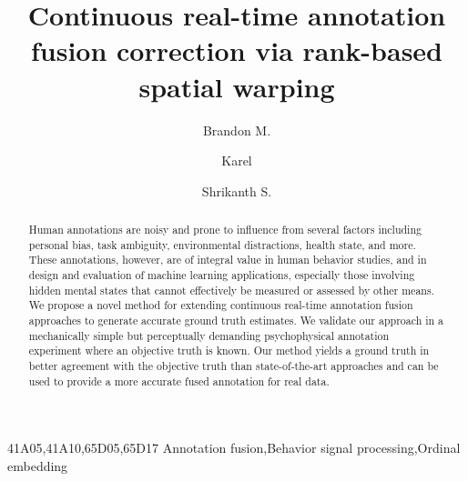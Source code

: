 \documentclass[times,twocolumn,final,authoryear]{elsarticle}
\begin{document}
\thispagestyle{empty}

\ifpreprint
  \setcounter{page}{1}
\else
  \setcounter{page}{1}
\fi

\begin{frontmatter}

\title{Continuous real-time annotation fusion correction via rank-based spatial warping}

\author[1]{Brandon M. } 
\author[1]{Karel }
\author[1]{Shrikanth S. }

\address[1]{Signal Analysis and Interpretation Lab, University of Southern California, 3740 McClinktock Avenue, EEB 400, Los Angeles, CA 90089, USA}



\begin{abstract}
Human annotations are noisy and prone to influence from several factors including personal bias, task ambiguity, environmental distractions, health state, and more.  These annotations, however, are of integral value in human behavior studies, and in design and evaluation of machine learning applications, especially those involving hidden mental states that cannot effectively be measured or assessed by other means.  We propose a novel method for extending continuous real-time annotation fusion approaches to generate accurate ground truth estimates.  We validate our approach in a mechanically simple but perceptually demanding psychophysical annotation experiment where an objective truth is known.  Our method yields a ground truth in better agreement with the objective truth than state-of-the-art approaches and can be used to provide a more accurate fused annotation for real data.
\end{abstract}

\begin{keyword}
\MSC 41A05\sep 41A10\sep 65D05\sep 65D17
\KWD Annotation fusion\sep Behavior signal processing\sep Ordinal embedding
\end{keyword}

\end{frontmatter}
\end{document}
